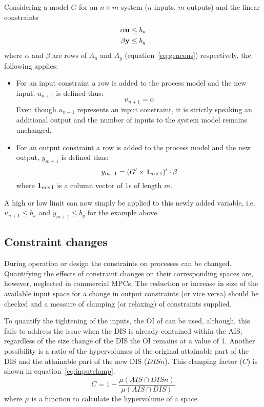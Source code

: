 \documentclass[final,authoryear,5pt,times,twocolumn]{elsarticle}
\newcommand{\vect}[1] %
{{\bf {#1}}}
\begin{document}
Considering a model $G$ for an $n\times m$ system ($n$ inputs, $m$ outputs) and the linear constraints 
\begin{align}
  \alpha \vect{u} &\leq b_u\notag\\ 
  \beta \vect{y} &\leq b_y \notag   
\end{align}
where $\alpha$ and $\beta$ are rows of $A_u$ and $A_y$ (equation~\ref{eq:gencons}) respectively, the following applies:
\begin{itemize}
\item For an input constraint a row is added to the process model and the new input, $u_{n+1}$ is defined thus:
\begin{equation}
  \label{eq:linconinput}
   u_{n+1} = \alpha
\end{equation}
Even though $u_{n+1}$ represents an input constraint, it is strictly speaking an additional output and the number of inputs to the system model remains unchanged. 
\item For an output constraint a row is added to the process model and the new output, $y_{m+1}$ is defined thus:
\begin{equation}
  \label{eq:linconoutput}
   y_{m+1} = (G'\times\vect{1}_{m\times 1})'\cdot\beta
\end{equation}
where $\vect{1}_{m\times 1}$ is a column vector of 1s of length $m$.
\end{itemize}
A high or low limit can now simply be applied to this newly added variable, i.e. $u_{n+1}\leq b_u$ and $y_{m+1}\leq b_y$ for the example above.

\subsection{Constraint changes}
During operation or design the constraints on processes can be changed.
Quantifying the effects of constraint changes on their corresponding spaces are, however, neglected in commercial MPCs.
The reduction or increase in size of the available input space for a change in output constraints (or vice versa) should be checked and a measure of clamping (or relaxing) of constraints supplied.

To quantify the tightening of the inputs, the OI of \citet{vinsonphd} can be used, although, this fails to address the issue when the DIS is already contained within the AIS; regardless of the size change of the DIS the OI remains at a value of 1.
Another possibility is a ratio of the hypervolumes of the original attainable part of the DIS and the attainable part of the new DIS ($DISn$).
This clamping factor ($C$) is shown in equation~\ref{eq:inputclamp}.
\begin{equation}
  \label{eq:inputclamp}
  C = 1-\frac{\mu(AIS \cap DISn)}{\mu(AIS \cap DIS)}
\end{equation}
where $\mu$ is a function to calculate the hypervolume of a space.
\end{document}

